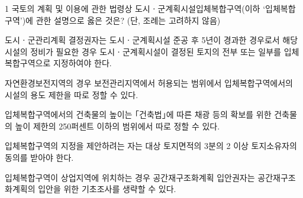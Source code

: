 \begin{question}{1}
국토의 계획 및 이용에 관한 법령상 도시ㆍ군계획시설입체복합구역(이하 ‘입체복합구역’)에 관한 설명으로 옳은 것은? (단, 조례는 고려하지 않음)
\begin{choices}
  \item 도시ㆍ군관리계획 결정권자는 도시ㆍ군계획시설 준공 후 5년이 경과한 경우로서 해당 시설의 정비가 필요한 경우 도시ㆍ군계획시설이 결정된 토지의 전부 또는 일부를 입체복합구역으로 지정하여야 한다.
  \item 자연환경보전지역의 경우 보전관리지역에서 허용되는 범위에서 입체복합구역에서의 시설의 용도 제한을 따로 정할 수 있다.
  \item 입체복합구역에서의 건축물의 높이는 ｢건축법｣에 따른 채광 등의 확보를 위한 건축물의 높이 제한의 250퍼센트 이하의 범위에서 따로 정할 수 있다.
  \item 입체복합구역의 지정을 제안하려는 자는 대상 토지면적의 3분의 2 이상 토지소유자의 동의를 받아야 한다.
  \item 입체복합구역이 상업지역에 위치하는 경우 공간재구조화계획 입안권자는 공간재구조화계획의 입안을 위한 기초조사를 생략할 수 있다.
\end{choices}
\end{question}
